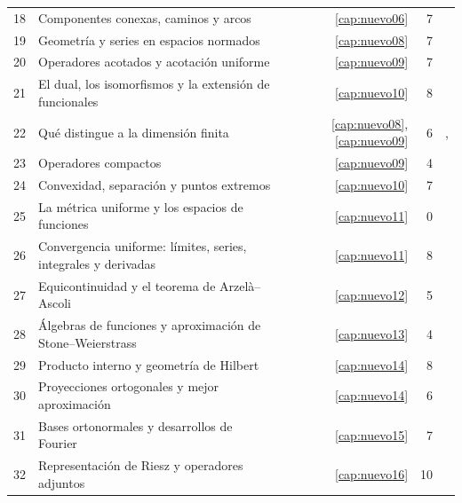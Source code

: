 \begin{longtable}{@{}r>{\raggedright\arraybackslash}p{}rrr@{}}
18 & Componentes conexas, caminos y arcos & \ref{cap:nuevo06} & 7 & \pageref{lectura:18}\\
19 & Geometría y series en espacios normados & \ref{cap:nuevo08} & 7 & \pageref{lectura:19}\\
20 & Operadores acotados y acotación uniforme & \ref{cap:nuevo09} & 7 & \pageref{lectura:20}\\
21 & El dual, los isomorfismos y la extensión de funcionales & \ref{cap:nuevo10} & 8 & \pageref{lectura:21}\\
22 & Qué distingue a la dimensión finita & \ref{cap:nuevo08}, \ref{cap:nuevo09} & 6 & \pageref{lectura:22}, \pageref{ch22:rango-finito-kernel}\\
23 & Operadores compactos & \ref{cap:nuevo09} & 4 & \pageref{lectura:23}\\
24 & Convexidad, separación y puntos extremos & \ref{cap:nuevo10} & 7 & \pageref{lectura:24}\\
25 & La métrica uniforme y los espacios de funciones & \ref{cap:nuevo11} & 0 & \pageref{lectura:25}\\
26 & Convergencia uniforme: límites, series, integrales y derivadas & \ref{cap:nuevo11} & 8 & \pageref{lectura:26}\\
27 & Equicontinuidad y el teorema de Arzelà--Ascoli & \ref{cap:nuevo12} & 5 & \pageref{lectura:27}\\
28 & Álgebras de funciones y aproximación de Stone--Weierstrass & \ref{cap:nuevo13} & 4 & \pageref{lectura:28}\\
29 & Producto interno y geometría de Hilbert & \ref{cap:nuevo14} & 8 & \pageref{lectura:29}\\
30 & Proyecciones ortogonales y mejor aproximación & \ref{cap:nuevo14} & 6 & \pageref{lectura:30}\\
31 & Bases ortonormales y desarrollos de Fourier & \ref{cap:nuevo15} & 7 & \pageref{lectura:31}\\
32 & Representación de Riesz y operadores adjuntos & \ref{cap:nuevo16} & 10 & \pageref{lectura:32}\\
\end{longtable}
\normalsize

